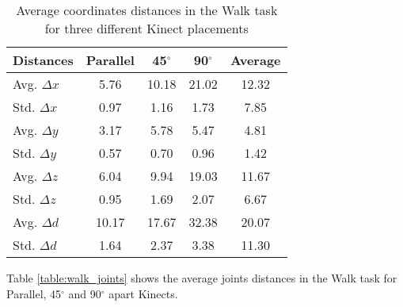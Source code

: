 \begin{table}[!htb]
\centering
\begin{tabularx}{1.0\columnwidth}{||X c c c c||} 
 \hline
 \textbf{Distances} & \textbf{Parallel} & \textbf{45$^{\circ}$} & \textbf{90$^{\circ}$} & \textbf{Average} \\ [0.5ex] 
 \hline\hline
 Avg. $\Delta x$ & 5.76 & 10.18 & 21.02 & 12.32 \\
 \hline
 Std. $\Delta x$ & 0.97 & 1.16 & 1.73 & 7.85 \\
 \hline
 Avg. $\Delta y$ & 3.17 & 5.78 & 5.47 & 4.81 \\
 \hline
 Std. $\Delta y$ & 0.57 & 0.70 & 0.96 & 1.42 \\
 \hline
 Avg. $\Delta z$ & 6.04 & 9.94 & 19.03 & 11.67 \\
 \hline
 Std. $\Delta z$ & 0.95 & 1.69 & 2.07 & 6.67 \\
 \hline
 Avg. $\Delta d$ & 10.17 & 17.67 & 32.38 & 20.07 \\
 \hline
 Std. $\Delta d$ & 1.64 & 2.37 & 3.38 & 11.30 \\
 \hline
\end{tabularx}
\caption{Average coordinates distances in the Walk task for three different Kinect placements}
\label{table:walk_coordinates_values}
\end{table}

Table \ref{table:walk_joints} shows the average joints distances in the Walk task for Parallel, 45$^{\circ}$ and 90$^{\circ}$ apart Kinects.

